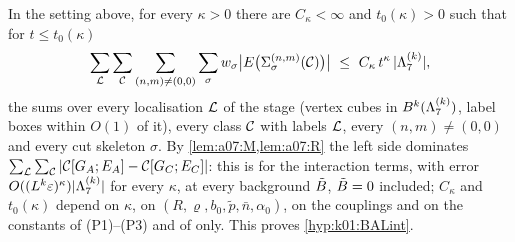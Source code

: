 \begin{theorem}\label{thm:a07:dom}
In the setting above, for every $\kappa>0$ there are $C_\kappa<\infty$ and $t_0(\kappa)>0$ such that for $t\le t_0(\kappa)$
\[
\sum_{\cL}\sum_{\cC}\sum_{(n,m)\ne(0,0)}\sum_{\sigma}w_\sigma\big|E\big(\Sigma^{(n,m)}_\sigma(\cC)\big)\big|\ \le\ C_\kappa\,t^{\kappa}\,|\Lsev|,
\]
the sums over every localisation $\mathcal L$ of the stage (vertex cubes in $B^k(\Lambda^{(k)}_{7})$, label boxes within $O(1)$ of it), every class $\mathcal C$ with labels $\mathcal L$, every $(n,m)\ne(0,0)$ and every cut skeleton $\sigma$. By \cref{lem:a07:M,lem:a07:R} the left side dominates $\sum_{\mathcal L}\sum_{\mathcal C}|\mathcal C[G_A;E_A]-\mathcal C[G_C;E_C]|$: this is \cite[Prop.~2.6]{Ba2} for the interaction terms, with error $O((L^k\varepsilon)^\kappa)|\Lambda^{(k)}_{7}|$ for every $\kappa$, at every background $\tilde B$, $\tilde B=0$ included; $C_\kappa$ and $t_0(\kappa)$ depend on $\kappa$, on $(R,\varrho,b_0,\tilde p,\bar n,\alpha_0)$, on the couplings and on the constants of \textup{(P1)--(P3)} and of \cite[(1.33)]{Ba3} only. This proves \cref{hyp:k01:BALint}.
\end{theorem}

